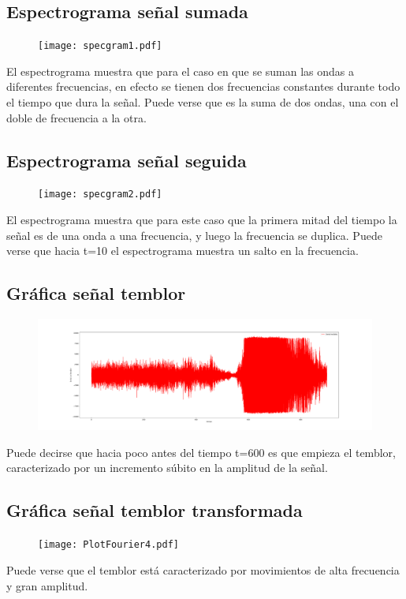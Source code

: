 \documentclass[11pt,letterpaper]{exam}
\begin{document}
\subsection{Espectrograma señal sumada}
\begin{figure}[H]
\centering
\texttt{[image: specgram1.pdf]}
\end{figure}
El espectrograma muestra que para el caso en que se suman las ondas a diferentes frecuencias, en efecto se tienen dos frecuencias constantes durante todo el tiempo que dura la señal. Puede verse que es la suma de dos ondas, una con el doble de frecuencia a la otra.
\subsection{Espectrograma señal seguida}
\begin{figure}[H]
\centering
\texttt{[image: specgram2.pdf]}
\end{figure}
El espectrograma muestra que para este caso que la primera mitad del tiempo la señal es de una onda a una frecuencia, y luego la frecuencia se duplica. Puede verse que hacia t=10 el espectrograma muestra un salto en la frecuencia.
\subsection{Gráfica señal temblor}
\begin{figure}[H]
\centering
\includegraphics[scale=0.25]{PlotFourier3.pdf}
\end{figure}
Puede decirse que hacia poco antes del tiempo t=600 es que empieza el temblor, caracterizado por un incremento súbito en la amplitud de la señal.

\subsection{Gráfica señal temblor transformada}
\begin{figure}[H]
\centering
\texttt{[image: PlotFourier4.pdf]}
\end{figure}
Puede verse que el temblor está caracterizado por movimientos de alta frecuencia y gran amplitud.
\end{document}
